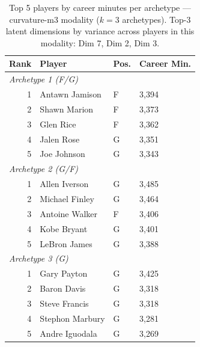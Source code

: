 \begin{table}[htbp]
  \centering\small
  \begin{tabular}{rlll}
    \toprule
    Rank & Player & Pos. & Career Min. \\
    \midrule
    \multicolumn{4}{l}{\textit{Archetype 1 (F/G)}} \\
    \midrule
    1 & Antawn Jamison & F & 3,394 \\
    2 & Shawn Marion & F & 3,373 \\
    3 & Glen Rice & F & 3,362 \\
    4 & Jalen Rose & G & 3,351 \\
    5 & Joe Johnson & G & 3,343 \\
    \midrule[0.4pt]
    \multicolumn{4}{l}{\textit{Archetype 2 (G/F)}} \\
    \midrule
    1 & Allen Iverson & G & 3,485 \\
    2 & Michael Finley & G & 3,464 \\
    3 & Antoine Walker & F & 3,406 \\
    4 & Kobe Bryant & G & 3,401 \\
    5 & LeBron James & G & 3,388 \\
    \midrule[0.4pt]
    \multicolumn{4}{l}{\textit{Archetype 3 (G)}} \\
    \midrule
    1 & Gary Payton & G & 3,425 \\
    2 & Baron Davis & G & 3,318 \\
    3 & Steve Francis & G & 3,318 \\
    4 & Stephon Marbury & G & 3,281 \\
    5 & Andre Iguodala & G & 3,269 \\
    \bottomrule
  \end{tabular}
  \caption{Top 5 players by career minutes per archetype --- curvature-m3 modality ($k=3$ archetypes). Top-3 latent dimensions by variance across players in this modality: Dim 7, Dim 2, Dim 3.}
  \label{tab:arch_reps_curvature_m3}
\end{table}

